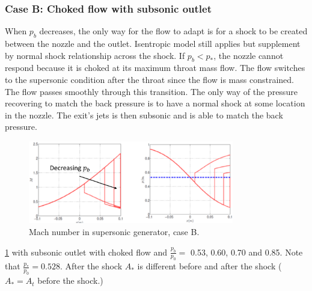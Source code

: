 \documentclass[class=report, crop=false, 12pt,a4paper]{standalone}
\begin{document}
\subsubsection{Case B: Choked flow with subsonic outlet}
When $p_b$ decreases, the only way for the flow to adapt is for a shock to be created between the nozzle and the outlet. Isentropic model still applies but supplement by normal shock relationship across the shock. If $p_b < p_*$, the nozzle cannot respond because it is choked at its maximum throat mass flow. The flow switches to the supersonic condition after the throat since the flow is mass constrained. The flow passes smoothly through this transition. The only way of the pressure recovering to match the back pressure is to have a normal shock at some location in the nozzle. The exit's jets is then subsonic and is able to match the back pressure.
\begin{figure}[H]
    \centering
    \includegraphics[width = 0.8\textwidth]{../img/diagram58.png}
    \caption{Mach number in supersonic generator, case B.}
    \label{casebmachnumber}
\end{figure}
\ref{casebmachnumber} with subsonic outlet with choked flow and $\frac{p_b}{p_0} =$ 0.53, 0.60, 0.70 and 0.85. Note that $\frac{p_*}{p_0} = 0.528$. After the shock $A_*$ is different before and after the shock ($A_* = A_t$ before the shock.)
\end{document}
